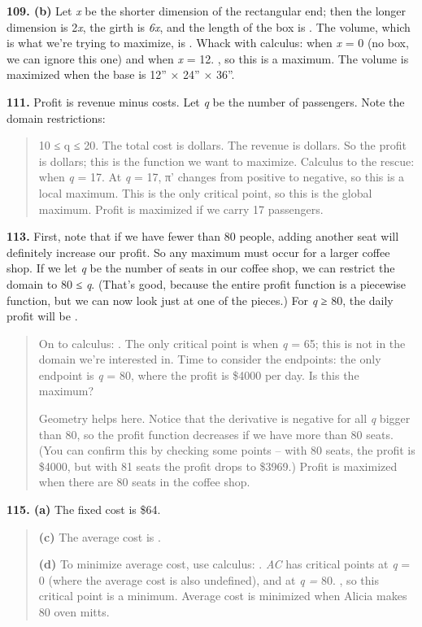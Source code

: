 \textbf{109. (b)} Let \emph{x} be the shorter dimension of the
rectangular end; then the longer dimension is 2\emph{x}, the girth is
\emph{6x}, and the length of the box is . The volume, which is what
we're trying to maximize, is . Whack with calculus: when \emph{x} = 0
(no box, we can ignore this one) and when \emph{x} = 12. , so this is a
maximum. The volume is maximized when the base is 12'' × 24'' × 36''.

\textbf{111.} Profit is revenue minus costs. Let \emph{q} be the number
of passengers. Note the domain restrictions:

\begin{quote}
10 ≤ q ≤ 20. The total cost is dollars. The revenue is dollars. So the
profit is dollars; this is the function we want to maximize. Calculus to
the rescue: when \emph{q} = 17. At \emph{q} = 17, π' changes from
positive to negative, so this is a local maximum. This is the only
critical point, so this is the global maximum. Profit is maximized if we
carry 17 passengers.
\end{quote}

\textbf{113.} First, note that if we have fewer than 80 people, adding
another seat will definitely increase our profit. So any maximum must
occur for a larger coffee shop. If we let \emph{q} be the number of
seats in our coffee shop, we can restrict the domain to 80 ≤ \emph{q}.
(That's good, because the entire profit function is a piecewise
function, but we can now look just at one of the pieces.) For \emph{q} ≥
80, the daily profit will be .

\begin{quote}
On to calculus: . The only critical point is when \emph{q} = 65; this is
not in the domain we're interested in. Time to consider the endpoints:
the only endpoint is \emph{q} = 80, where the profit is \$4000 per day.
Is this the maximum?

Geometry helps here. Notice that the derivative is negative for all
\emph{q} bigger than 80, so the profit function decreases if we have
more than 80 seats. (You can confirm this by checking some points --
with 80 seats, the profit is \$4000, but with 81 seats the profit drops
to \$3969.) Profit is maximized when there are 80 seats in the coffee
shop.
\end{quote}

\textbf{115. (a)} The fixed cost is \$64.

\begin{quote}
\textbf{(c)} The average cost is .

\textbf{(d)} To minimize average cost, use calculus: . \emph{AC} has
critical points at \emph{q} = 0 (where the average cost is also
undefined), and at \emph{q =} 80. , so this critical point is a minimum.
Average cost is minimized when Alicia makes 80 oven mitts.
\end{quote}

